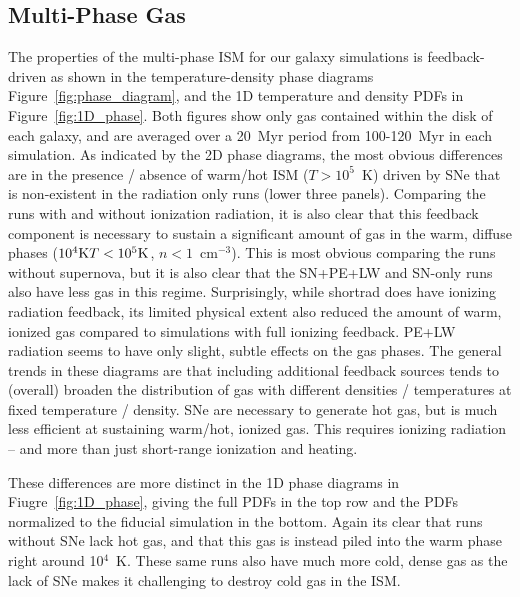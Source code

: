 \documentclass[twocolumn]{aastex62}
\newcommand{\aje}[1]{\textcolor{blue}{\textbf{(AJE: #1)}}}
\begin{document}
\subsection{Multi-Phase Gas}
The properties of the multi-phase ISM for our galaxy simulations is feedback-driven as shown in the temperature-density phase diagrams Figure~\ref{fig:phase_diagram}, and the 1D temperature and density PDFs in Figure~\ref{fig:1D_phase}. Both figures show only gas contained within the disk of each galaxy, and are averaged over a 20~Myr period from 100-120~Myr in each simulation. As indicated by the 2D phase diagrams, the most obvious differences are in the presence / absence of warm/hot ISM ($T > 10^5$~K) driven by SNe that is non-existent in the radiation only runs (lower three panels). Comparing the runs with and without ionization radiation, it is also clear that this feedback component is necessary to sustain a significant amount of gas in the warm, diffuse phases ($10^4 {\rm K} T < 10^5 {\rm K}$, $n < 1$~cm$^{-3}$). This is most obvious comparing the runs without supernova, but it is also clear that the SN+PE+LW and SN-only runs also have less gas in this regime. Surprisingly, while shortrad does have ionizing radiation feedback, its limited physical extent also reduced the amount of warm, ionized gas compared to simulations with full ionizing feedback. PE+LW radiation seems to have only slight, subtle effects on the gas phases. The general trends in these diagrams are that including additional feedback sources tends to (overall) broaden the distribution of gas with different densities / temperatures at fixed temperature / density. SNe are necessary to generate hot gas, but is much less efficient at sustaining warm/hot, ionized gas. This requires ionizing radiation -- and more than just short-range ionization and heating.

These differences are more distinct in the 1D phase diagrams in Fiugre~\ref{fig:1D_phase}, giving the full PDFs in the top row and the PDFs normalized to the fiducial simulation in the bottom. Again its clear that runs without SNe lack hot gas, and that this gas is instead piled into the warm phase right around 10$^4$~K. These same runs also have much more cold, dense gas as the lack of SNe makes it challenging to destroy cold gas in the ISM. 
\end{document}
